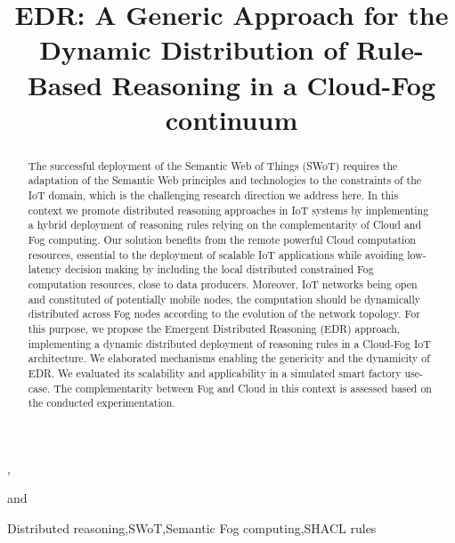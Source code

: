 \documentclass{iosart2c}
\begin{document}
\begin{frontmatter}                           %
	
\title{EDR: A Generic Approach for the Dynamic Distribution of Rule-Based Reasoning in a Cloud-Fog continuum}



\author[A,B]{ },
\author[B]{ }
\author[A]{ }
and
\author[B]{ }
\address[A]{IRIT,\\Maison de la Recherche, Univ. Toulouse Jean Jaurès,\\5 allées Antonio Machado, F-31000 Toulouse\\email: \{name.surname\}@irit.fr}
\address[B]{LAAS-CNRS,\\ Université de Toulouse, CNRS, INSA, Toulouse, France\\email: \{name.surname\}@laas.fr}



\begin{abstract}
The successful deployment of the Semantic Web of Things (SWoT) requires the adaptation of the Semantic Web principles and technologies to the constraints of the IoT domain, which is the challenging research direction we address here. 
In this context we promote distributed reasoning approaches in IoT systems by implementing a hybrid deployment of reasoning rules relying on the complementarity of Cloud and Fog computing.  
Our solution benefits from the remote powerful Cloud computation resources, essential to the deployment of scalable IoT applications while avoiding low-latency decision making by including the local distributed constrained Fog computation resources, close to data producers.
Moreover, IoT networks being open and constituted of potentially mobile nodes, the computation should be dynamically distributed across Fog nodes according to the evolution of the network topology.
For this purpose, we propose the Emergent Distributed Reasoning (EDR) approach, implementing a dynamic distributed deployment of reasoning rules in a Cloud-Fog IoT architecture.
We elaborated mechanisms enabling the genericity and the dynamicity of EDR.
We evaluated its scalability and applicability in a simulated smart factory use-case.
The complementarity between Fog and Cloud in this context is assessed based on the conducted experimentation.
\end{abstract}

\begin{keyword}
	Distributed reasoning\sep SWoT\sep Semantic Fog computing\sep SHACL rules
\end{keyword}
	
\end{frontmatter}
\end{document}
